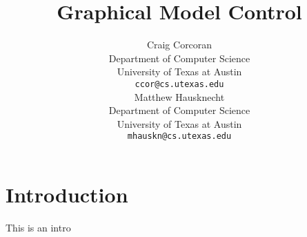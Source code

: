 \documentclass{article} %
\title{Graphical Model Control}
\author{
Craig Corcoran\\
Department of Computer Science\\
University of Texas at Austin\\
\texttt{ccor@cs.utexas.edu} \\
\And
Matthew Hausknecht\\
Department of Computer Science\\
University of Texas at Austin\\
\texttt{mhauskn@cs.utexas.edu} \\
}
\begin{document}
\maketitle

\begin{abstract}

\end{abstract}

\section{Introduction}
This is an intro



\end{document}
